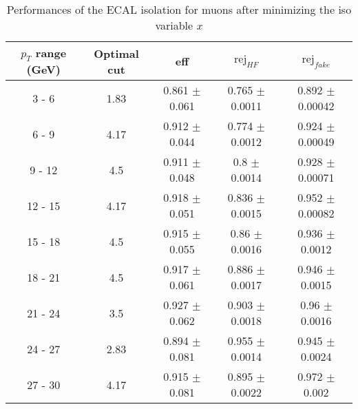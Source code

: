 \begin{table}[htbp]
   \centering
   \begin{tabular}{|c|c|c|c|c|}
      \hline
      $p_T$ range (GeV) & Optimal cut & eff & $\textrm{rej}_{HF}$ & $\textrm{rej}_{fake}$ \\
      \hline
      3 - 6 & 1.83 & 0.861 $\pm$ 0.061 & 0.765 $\pm$ 0.0011 & 0.892 $\pm$ 0.00042 \\
      \hline
      6 - 9 & 4.17 & 0.912 $\pm$ 0.044 & 0.774 $\pm$ 0.0012 & 0.924 $\pm$ 0.00049 \\
      \hline
      9 - 12 & 4.5 & 0.911 $\pm$ 0.048 & 0.8 $\pm$ 0.0014 & 0.928 $\pm$ 0.00071 \\
      \hline
      12 - 15 & 4.17 & 0.918 $\pm$ 0.051 & 0.836 $\pm$ 0.0015 & 0.952 $\pm$ 0.00082 \\
      \hline
      15 - 18 & 4.5 & 0.915 $\pm$ 0.055 & 0.86 $\pm$ 0.0016 & 0.936 $\pm$ 0.0012 \\
      \hline
      18 - 21 & 4.5 & 0.917 $\pm$ 0.061 & 0.886 $\pm$ 0.0017 & 0.946 $\pm$ 0.0015 \\
      \hline
      21 - 24 & 3.5 & 0.927 $\pm$ 0.062 & 0.903 $\pm$ 0.0018 & 0.96 $\pm$ 0.0016 \\
      \hline
      24 - 27 & 2.83 & 0.894 $\pm$ 0.081 & 0.955 $\pm$ 0.0014 & 0.945 $\pm$ 0.0024 \\
      \hline
      27 - 30 & 4.17 & 0.915 $\pm$ 0.081 & 0.895 $\pm$ 0.0022 & 0.972 $\pm$ 0.002 \\
      \hline
   \end{tabular}
   \caption{\small{Performances of the ECAL isolation for muons after minimizing the iso variable $x$}\label{tab:ecal_muon_opt}}
\end{table}






